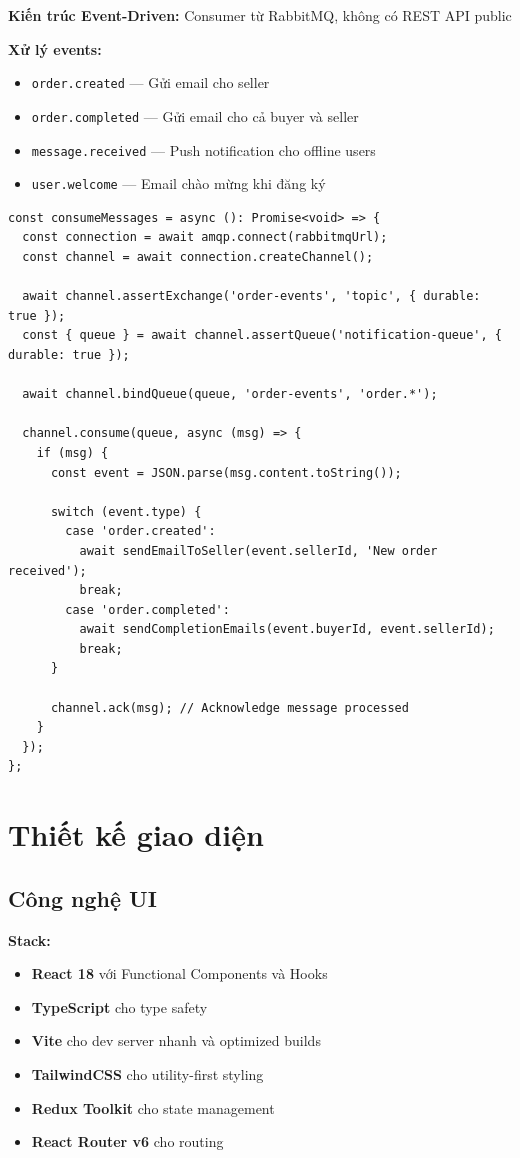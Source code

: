 \documentclass[12pt]{extreport}
\begin{document}
\textbf{Kiến trúc Event-Driven:} Consumer từ RabbitMQ, không có REST API public

\textbf{Xử lý events:}
\begin{itemize}
    \item \texttt{order.created} --- Gửi email cho seller
    \item \texttt{order.completed} --- Gửi email cho cả buyer và seller
    \item \texttt{message.received} --- Push notification cho offline users
    \item \texttt{user.welcome} --- Email chào mừng khi đăng ký
\end{itemize}

\begin{lstlisting}[style=TypeScriptStyle, caption={RabbitMQ Consumer}]
const consumeMessages = async (): Promise<void> => {
  const connection = await amqp.connect(rabbitmqUrl);
  const channel = await connection.createChannel();
  
  await channel.assertExchange('order-events', 'topic', { durable: true });
  const { queue } = await channel.assertQueue('notification-queue', { durable: true });
  
  await channel.bindQueue(queue, 'order-events', 'order.*');
  
  channel.consume(queue, async (msg) => {
    if (msg) {
      const event = JSON.parse(msg.content.toString());
      
      switch (event.type) {
        case 'order.created':
          await sendEmailToSeller(event.sellerId, 'New order received');
          break;
        case 'order.completed':
          await sendCompletionEmails(event.buyerId, event.sellerId);
          break;
      }
      
      channel.ack(msg); // Acknowledge message processed
    }
  });
};
\end{lstlisting}

\section{Thiết kế giao diện}

\subsection{Công nghệ UI}

\textbf{Stack:}
\begin{itemize}
    \item \textbf{React 18} với Functional Components và Hooks
    \item \textbf{TypeScript} cho type safety
    \item \textbf{Vite} cho dev server nhanh và optimized builds
    \item \textbf{TailwindCSS} cho utility-first styling
    \item \textbf{Redux Toolkit} cho state management
    \item \textbf{React Router v6} cho routing
\end{itemize}
\end{document}
